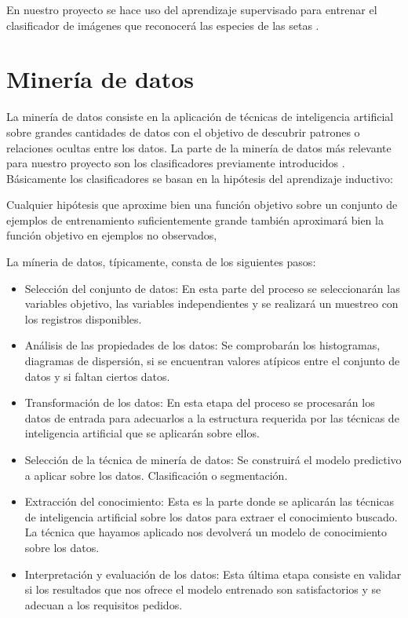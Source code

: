 En nuestro proyecto se hace uso del aprendizaje supervisado para entrenar el clasificador de imágenes que reconocerá las especies de las setas \cite{wiki:aprendizajeAutomatico}.

\section{Minería de datos}

La minería de datos consiste en la aplicación de técnicas de inteligencia artificial sobre grandes cantidades de datos con el objetivo de descubrir patrones o relaciones ocultas entre los datos. La parte de la minería de datos más relevante para nuestro proyecto son los clasificadores previamente introducidos \cite{procesosMineriaDatos}. Básicamente los clasificadores se basan en la hipótesis del aprendizaje inductivo:

Cualquier hipótesis que aproxime bien una función objetivo sobre un conjunto de ejemplos de entrenamiento suficientemente grande también aproximará bien la función objetivo en ejemplos no observados,

La míneria de datos, típicamente, consta de los siguientes pasos:
\begin{itemize}
	\item{Selección del conjunto de datos}: En esta parte del proceso se seleccionarán las variables objetivo, las variables independientes y se realizará un muestreo con los registros disponibles.
	\item{Análisis de las propiedades de los datos}: Se comprobarán los histogramas, diagramas de dispersión, si se encuentran valores atípicos entre el conjunto de datos y si faltan ciertos datos.
	\item{Transformación de los datos}: En esta etapa del proceso se procesarán los datos de entrada para adecuarlos a la estructura requerida por las técnicas de inteligencia artificial que se aplicarán sobre ellos.
	\item{Selección de la técnica de minería de datos}: Se construirá el modelo predictivo a aplicar sobre los datos. Clasificación o segmentación.
	\item{Extracción del conocimiento}: Esta es la parte donde se aplicarán las técnicas de inteligencia artificial sobre los datos para extraer el conocimiento buscado. La técnica que hayamos aplicado nos devolverá un modelo de conocimiento sobre los datos.
	\item{Interpretación y evaluación de los datos}: Esta última etapa consiste en validar si los resultados que nos ofrece el modelo entrenado son satisfactorios y se adecuan a los requisitos pedidos.
\end{itemize}

